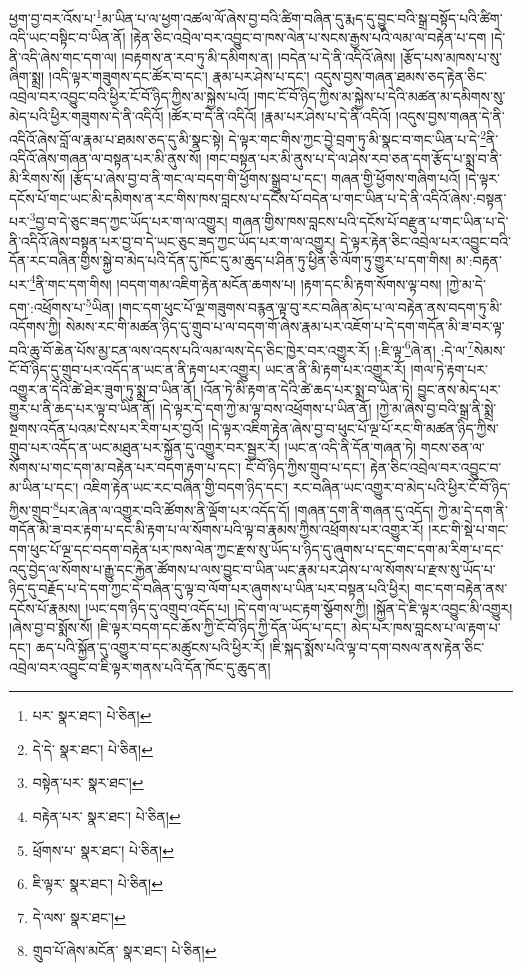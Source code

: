 ཕྱག་བྱ་བར་འོས་པ་\footnote{པར་  སྣར་ཐང་།  པེ་ཅིན། }མ་ཡིན་པ་ལ་ཕྱག་འཚལ་ལོ་ཞེས་བྱ་བའི་ཚིག་བཞིན་དུ་རྨད་དུ་བྱུང་བའི་སྒྲ་བསྟོད་པའི་ཚིག་འདི་ཡང་བསྟིང་བ་ཡིན་ནོ། །རྟེན་ཅིང་འབྲེལ་བར་འབྱུང་བ་ཁས་ལེན་པ་སངས་རྒྱས་པའི་ལམ་ལ་བརྟེན་པ་དག །དེ་ནི་འདི་ཞེས་གང་དག་ལ། །བརྟགས་ན་རབ་ཏུ་མི་དམིགས་ན། །བདེན་པ་དེ་ནི་འདིའོ་ཞེས། །རྩོད་པས་མཁས་པ་སུ་ཞིག་སྨྲ། །འདི་ལྟར་གཟུགས་དང་ཚོར་བ་དང་། རྣམ་པར་ཤེས་པ་དང་། འདུས་བྱས་གཞན་ཐམས་ཅད་རྟེན་ཅིང་འབྲེལ་བར་འབྱུང་བའི་ཕྱིར་ངོ་བོ་ཉིད་ཀྱིས་མ་སྐྱེས་པའོ། །གང་ངོ་བོ་ཉིད་ཀྱིས་མ་སྐྱེས་པ་དེའི་མཚན་མ་དམིགས་སུ་མེད་པའི་ཕྱིར་གཟུགས་དེ་ནི་འདིའོ། །ཚོར་བ་དེ་ནི་འདིའོ། །རྣམ་པར་ཤེས་པ་དེ་ནི་འདིའོ། །འདུས་བྱས་གཞན་དེ་ནི་འདིའོ་ཞེས་བློ་ལ་རྣམ་པ་ཐམས་ཅད་དུ་མི་སྣང་སྟེ། དེ་ལྟར་གང་གིས་ཀྱང་བྱེ་བྲག་ཏུ་མི་སྣང་བ་གང་ཡིན་པ་དེ་\footnote{དེ་དེ་  སྣར་ཐང་།  པེ་ཅིན། }ནི་འདིའོ་ཞེས་གཞན་ལ་བསྟན་པར་མི་ནུས་སོ། །གང་བསྟན་པར་མི་ནུས་པ་དེ་ལ་ཤེས་རབ་ཅན་དག་རྩོད་པ་སྨྲ་བ་ནི་མི་རིགས་སོ། །རྩོད་པ་ཞེས་བྱ་བ་ནི་གང་ལ་བདག་གི་ཕྱོགས་སྒྲུབ་པ་དང་། གཞན་གྱི་ཕྱོགས་གཞིག་པའོ། །དེ་ལྟར་དངོས་པོ་གང་ཡང་མི་དམིགས་ན་རང་གིས་ཁས་བླངས་པ་དངོས་པོ་བདེན་པ་གང་ཡིན་པ་དེ་ནི་འདིའོ་ཞེས་:བསྟན་པར་\footnote{བསྟེན་པར་  སྣར་ཐང་། }བྱ་བ་དེ་ཅུང་ཟད་ཀྱང་ཡོད་པར་ག་ལ་འགྱུར། གཞན་གྱིས་ཁས་བླངས་པའི་དངོས་པོ་བརྫུན་པ་གང་ཡིན་པ་དེ་ནི་འདིའོ་ཞེས་བསྟན་པར་བྱ་བ་དེ་ཡང་ཅུང་ཟད་ཀྱང་ཡོད་པར་ག་ལ་འགྱུར། དེ་ལྟར་རྟེན་ཅིང་འབྲེལ་པར་འབྱུང་བའི་དོན་རང་བཞིན་གྱིས་སྐྱེ་བ་མེད་པའི་དོན་དུ་ཁོང་དུ་མ་ཆུད་པ་ཤིན་ཏུ་ཕྱིན་ཅི་ལོག་ཏུ་གྱུར་པ་དག་གིས། མ་:བརྟན་པར་\footnote{བརྟེན་པར་  སྣར་ཐང་།  པེ་ཅིན། }ནི་གང་དག་གིས། །བདག་གམ་འཇིག་རྟེན་མངོན་ཆགས་པ། །རྟག་དང་མི་རྟག་སོགས་ལྟ་བས། །ཀྱེ་མ་དེ་དག་:འཕྲོགས་པ་\footnote{ཕྲོགས་པ་  སྣར་ཐང་།  པེ་ཅིན། }ཡིན། །གང་དག་ཕུང་པོ་ལྔ་གཟུགས་བརྙན་ལྟ་བུ་རང་བཞིན་མེད་པ་ལ་བརྟེན་ནས་བདག་ཏུ་མི་འདོགས་ཀྱི། སེམས་རང་གི་མཚན་ཉིད་དུ་གྲུབ་པ་ལ་བདག་གོ་ཞེས་རྣམ་པར་འཇོག་པ་དེ་དག་གདོན་མི་ཟ་བར་ལྟ་བའི་ཆུ་བོ་ཆེན་པོས་མྱ་ངན་ལས་འདས་པའི་ལམ་ལས་དེད་ཅིང་ཁྱེར་བར་འགྱུར་རོ། །:ཇི་ལྟ་\footnote{ཇི་ལྟར་  སྣར་ཐང་།  པེ་ཅིན། }ཞེ་ན། :དེ་ལ་\footnote{དེ་ལས་  སྣར་ཐང་། }སེམས་ངོ་བོ་ཉིད་དུ་གྲུབ་པར་འདོད་ན་ཡང་ན་ནི་རྟག་པར་འགྱུར། ཡང་ན་ནི་མི་རྟག་པར་འགྱུར་རོ། །གལ་ཏེ་རྟག་པར་འགྱུར་ན་དེའི་ཚེ་ཐེར་ཟུག་ཏུ་སྨྲ་བ་ཡིན་ནོ། །འོན་ཏེ་མི་རྟག་ན་དེའི་ཚེ་ཆད་པར་སྨྲ་བ་ཡིན་ཏེ། བྱུང་ནས་མེད་པར་གྱུར་པ་ནི་ཆད་པར་ལྟ་བ་ཡིན་ནོ། །དེ་ལྟར་དེ་དག་ཀྱེ་མ་ལྟ་བས་འཕྲོགས་པ་ཡིན་ནོ། །ཀྱེ་མ་ཞེས་བྱ་བའི་སྒྲ་ནི་སྨྲེ་སྔགས་འདོན་པའམ་ངེས་པར་རིག་པར་བྱའོ། །དེ་ལྟར་འཇིག་རྟེན་ཞེས་བྱ་བ་ཕུང་པོ་ལྔ་པོ་རང་གི་མཚན་ཉིད་ཀྱིས་གྲུབ་པར་འདོད་ན་ཡང་མཐུན་པར་སྐྱོན་དུ་འགྱུར་བར་སྦྱར་རོ། །ཡང་ན་འདི་ནི་དོན་གཞན་ཏེ། གངས་ཅན་ལ་སོགས་པ་གང་དག་མ་བརྟེན་པར་བདག་རྟག་པ་དང་། ངོ་བོ་ཉིད་ཀྱིས་གྲུབ་པ་དང་། རྟེན་ཅིང་འབྲེལ་བར་འབྱུང་བ་མ་ཡིན་པ་དང་། འཇིག་རྟེན་ཡང་རང་བཞིན་གྱི་བདག་ཉིད་དང་། རང་བཞིན་ཡང་འགྱུར་བ་མེད་པའི་ཕྱིར་ངོ་བོ་ཉིད་ཀྱིས་གྲུབ་\footnote{གྲུབ་པོ་ཞེས་མངོན་  སྣར་ཐང་།  པེ་ཅིན། }པར་ཞེན་ལ་འགྱུར་བའི་ཚོགས་ནི་ལྡོག་པར་འདོད་དོ། །གཞན་དག་ནི་གཞན་དུ་འདོད། ཀྱེ་མ་དེ་དག་ནི་གདོན་མི་ཟ་བར་རྟག་པ་དང་མི་རྟག་པ་ལ་སོགས་པའི་ལྟ་བ་རྣམས་ཀྱིས་འཕྲོགས་པར་འགྱུར་རོ། །རང་གི་སྡེ་པ་གང་དག་ཕུང་པོ་ལྔ་དང་བདག་བརྟེན་པར་ཁས་ལེན་ཀྱང་རྫས་སུ་ཡོད་པ་ཉིད་དུ་ཞུགས་པ་དང་གང་དག་མ་རིག་པ་དང་འདུ་བྱེད་ལ་སོགས་པ་རྒྱུ་དང་རྐྱེན་ཚོགས་པ་ལས་བྱུང་བ་ཡིན་ཡང་རྣམ་པར་ཤེས་པ་ལ་སོགས་པ་རྫས་སུ་ཡོད་པ་ཉིད་དུ་བརྗོད་པ་དེ་དག་ཀྱང་དེ་བཞིན་དུ་ལྟ་བ་ལོག་པར་ཞུགས་པ་ཡིན་པར་བསྟན་པའི་ཕྱིར། གང་དག་བརྟེན་ནས་དངོས་པོ་རྣམས། །ཡང་དག་ཉིད་དུ་འགྲུབ་འདོད་པ། །དེ་དག་ལ་ཡང་རྟག་སྩོགས་ཀྱི། །སྐྱོན་དེ་ཇི་ལྟར་འབྱུང་མི་འགྱུར། །ཞེས་བྱ་བ་སྨོས་སོ། །ཇི་ལྟར་བདག་དང་ཆོས་ཀྱི་ངོ་བོ་ཉིད་ཀྱི་དོན་ཡོད་པ་དང་། མེད་པར་ཁས་བླངས་པ་ལ་རྟག་པ་དང་། ཆད་པའི་སྐྱོན་དུ་འགྱུར་བ་དང་མཚུངས་པའི་ཕྱིར་རོ། །ཇི་སྐད་སྨོས་པའི་ལྟ་བ་དག་བསལ་ནས་རྟེན་ཅིང་འབྲེལ་བར་འབྱུང་བ་ཇི་ལྟར་གནས་པའི་དོན་ཁོང་དུ་ཆུད་ན། 
